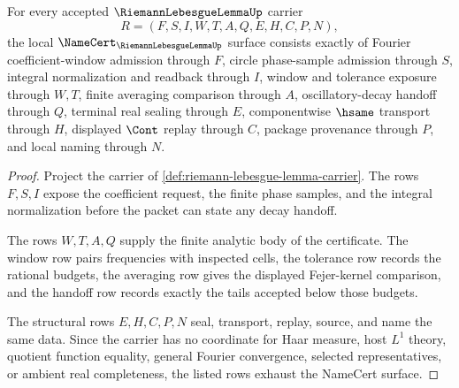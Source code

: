 \begin{theorem}
\label{thm:riemann-lebesgue-lemma-namecert-obligations}
For every accepted $\RiemannLebesgueLemmaUp$ carrier
$$
R=(F,S,I,W,T,A,Q,E,H,C,P,N),
$$
the local $\NameCert_{\RiemannLebesgueLemmaUp}$ surface consists exactly of Fourier coefficient-window admission through $F$, circle phase-sample admission through $S$, integral normalization and readback through $I$, window and tolerance exposure through $W,T$, finite averaging comparison through $A$, oscillatory-decay handoff through $Q$, terminal real sealing through $E$, componentwise $\hsame$ transport through $H$, displayed $\Cont$ replay through $C$, package provenance through $P$, and local naming through $N$.
\end{theorem}
\begin{proof}
Project the carrier of \autoref{def:riemann-lebesgue-lemma-carrier}. The rows $F,S,I$ expose the coefficient request, the finite phase samples, and the integral normalization before the packet can state any decay handoff.

The rows $W,T,A,Q$ supply the finite analytic body of the certificate. The window row pairs frequencies with inspected cells, the tolerance row records the rational budgets, the averaging row gives the displayed Fejer-kernel comparison, and the handoff row records exactly the tails accepted below those budgets.

The structural rows $E,H,C,P,N$ seal, transport, replay, source, and name the same data. Since the carrier has no coordinate for Haar measure, host $L^{1}$ theory, quotient function equality, general Fourier convergence, selected representatives, or ambient real completeness, the listed rows exhaust the NameCert surface.
\end{proof}

